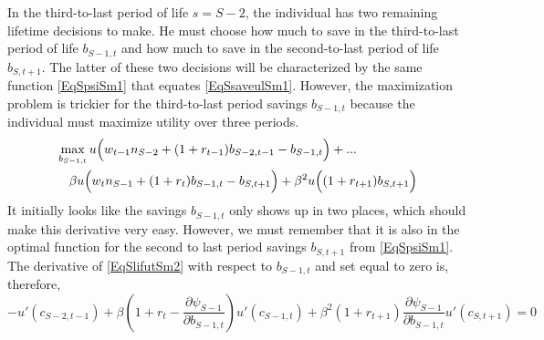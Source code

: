 \documentclass[letterpaper,12pt]{article}
\theoremstyle{definition}
\numberwithin{equation}{section}
\numberwithin{exercise}{section}
\begin{document}
\begin{spacing}{1.5}
      In the third-to-last period of life $s=S-2$, the individual has two remaining lifetime decisions to make. He must choose how much to save in the third-to-last period of life $b_{S-1,t}$ and how much to save in the second-to-last period of life $b_{S,t+1}$. The latter of these two decisions will be characterized by the same function \eqref{EqSpsiSm1} that equates \eqref{EqSsaveulSm1}. However, the maximization problem is trickier for the third-to-last period savings $b_{S-1,t}$ because the individual must maximize utility over three periods.
      \begin{equation}\label{EqSlifutSm2}
         \begin{split}
            &\max_{b_{S-1,t}} u\Bigl(w_{t-1} n_{S-2} + (1 + r_{t-1})b_{S-2,t-1} - b_{S-1,t}\Bigr) + ... \\
            &\quad \beta u\Bigl(w_t n_{S-1} + (1 + r_{t})b_{S-1,t} - b_{S,t+1}\Bigr) + \beta^2 u\Bigl((1 + r_{t+1})b_{S,t+1}\Bigr)
         \end{split}
      \end{equation}
      It initially looks like the savings $b_{S-1,t}$ only shows up in two places, which should make this derivative very easy. However, we must remember that it is also in the optimal function for the second to last period savings $b_{S,t+1}$ from \eqref{EqSpsiSm1}. The derivative of \eqref{EqSlifutSm2} with respect to $b_{S-1,t}$ and set equal to zero is, therefore,
      \begin{equation}\label{EqSsaveulSm2a}
         -u'(c_{S-2,t-1}) + \beta\left(1 + r_t - \frac{\partial\psi_{S-1}}{\partial b_{S-1,t}}\right)u'(c_{S-1,t}) + \beta^2(1+r_{t+1})\frac{\partial\psi_{S-1}}{\partial b_{S-1,t}}u'(c_{S,t+1}) = 0
      \end{equation}


\end{spacing}
\end{document}
